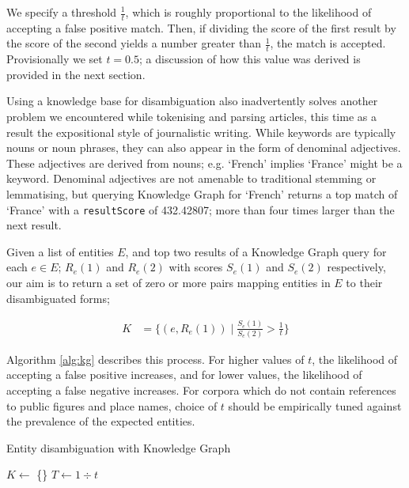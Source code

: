 We specify a threshold $\frac{1}{t}$, which is roughly proportional to the likelihood of accepting a false positive match. Then, if dividing the score of the first result by the score of the second yields a number greater than $\frac{1}{t}$, the match is accepted. Provisionally we set $t=0.5$; a discussion of how this value was derived is provided in the next section.

Using a knowledge base for disambiguation also inadvertently solves another problem we encountered while tokenising and parsing articles, this time as a result the expositional style of journalistic writing. While keywords are typically nouns or noun phrases, they can also appear in the form of denominal adjectives. These adjectives are derived from nouns; e.g. `French' implies `France' might be a keyword. Denominal adjectives are not amenable to traditional stemming or lemmatising, but querying Knowledge Graph for `French' returns a top match of `France' with a \texttt{resultScore} of 432.42807; more than four times larger than the next result.

Given a list of entities $E$, and top two results of a Knowledge Graph query for each $e \in E$; $R_e(1)$ and $R_e(2)$ with scores $S_e(1)$ and $S_e(2)$ respectively, our aim is to return a set of zero or more pairs mapping entities in $E$ to their disambiguated forms;

\begin{align*}
K &= \bigg\{(e, R_e(1))\;|\;\frac{S_e(1)}{S_e(2)} > \frac{1}{t}\bigg\}
\end{align*}

Algorithm \ref{alg:kg} describes this process. For higher values of $t$, the likelihood of accepting a false positive increases, and for lower values, the likelihood of accepting a false negative increases. For corpora which do not contain references to public figures and place names, choice of $t$ should be empirically tuned against the prevalence of the expected entities.\\

\begin{algorithm}
\label{alg:kg}
 \caption{Entity disambiguation with Knowledge Graph}
 $K \gets$ \{\}\;
 $T \gets 1\div{t}$\;
\end{algorithm}

